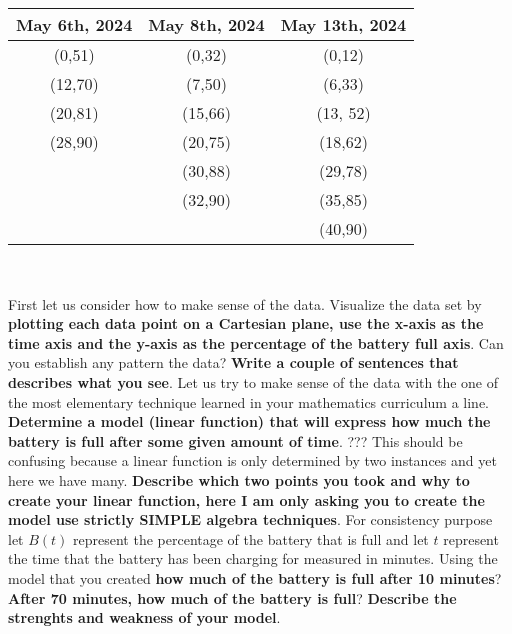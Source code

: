 \documentclass[10pt,letterpaper]{article}
\begin{document}
\begin{enumerate}
\begin{multicols}{2}
\begin{tabular}{c|c|c}

May 6th, 2024  & May 8th, 2024 & May 13th, 2024  \\
\hline
(0,51)  & (0,32) & (0,12)  \\
(12,70) & (7,50) & (6,33)\\
(20,81) & (15,66) & (13, 52)\\
(28,90) & (20,75) & (18,62)\\
 & (30,88) & (29,78) \\
&(32,90) & (35,85) \\
& & (40,90)
\end{tabular}\\

\end{multicols}

First let us consider how to make sense of the data.  Visualize the data set by \textbf{plotting each data point on a Cartesian plane, use the x-axis as the time axis and the y-axis as the percentage of the battery full axis}.  Can you establish any pattern the data?  \textbf{Write a couple of sentences that describes what you see}.  Let us try to make sense of the data with the one of the most elementary technique learned in your mathematics curriculum a line.  \textbf{Determine a model (linear function) that will express how much the battery is full after some given amount of time}.  ??? This should be confusing because a linear function is only determined by two instances and yet here we have many.  \textbf{Describe which two points you took and why to create your linear function, here I am only asking you to create the model use strictly SIMPLE algebra techniques}.  For consistency purpose let $B(t)$ represent the percentage of the battery that is full and let $t$ represent the time that the battery has been charging for measured in minutes.  Using the model that you created \textbf{how much of the battery is full after 10 minutes}?  \textbf{After 70 minutes, how much of the battery is full}?  \textbf{Describe the strenghts and weakness of your model}.\\


\end{enumerate}
\end{document}
